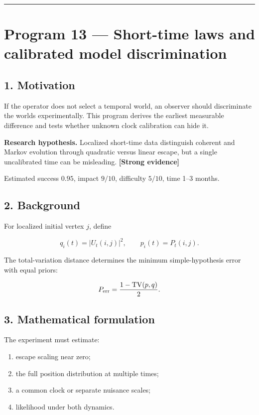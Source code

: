 \documentclass[11pt,a4paper,openany]{report}
\newcommand{\statusStrong}{\textcolor{finblue}{[Strong evidence]}}
\begin{document}
\par\medskip\hrule\medskip

\chapter{Program 13 — Short-time laws and calibrated model discrimination}

\section{1. Motivation}

If the operator does not select a temporal world, an observer should discriminate the worlds experimentally. This program derives the earliest measurable difference and tests whether unknown clock calibration can hide it.

\textbf{Research hypothesis.} Localized short-time data distinguish coherent and Markov evolution through quadratic versus linear escape, but a single uncalibrated time can be misleading. \textbf{\statusStrong{}}

Estimated success \(0.95\), impact \(9/10\), difficulty \(5/10\), time 1–3 months.

\section{2. Background}

For localized initial vertex \(j\), define

\[
q_i(t)=|U_t(i,j)|^2,\qquad
p_i(t)=P_t(i,j).
\]

The total-variation distance determines the minimum simple-hypothesis error with equal priors:

\[
P_{\rm err}=\frac{1-\operatorname{TV}(p,q)}2.
\]

\section{3. Mathematical formulation}

The experiment must estimate:

\begin{enumerate}
\item 
escape scaling near zero;

\item 
the full position distribution at multiple times;

\item 
a common clock or separate nuisance scales;

\item 
likelihood under both dynamics.

\end{enumerate}
\end{document}
